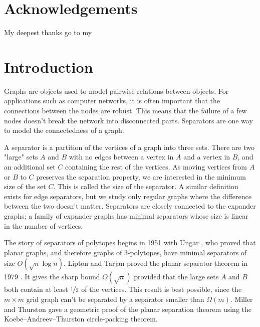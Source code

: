 \documentclass[a4paper,12pt]{book}
\theoremstyle{plain}
\theoremstyle{definition}
\begin{document}
\cleardoublepage




\pagestyle{scrheadings}

\newcommand{\header}[1]{\markboth{}{\MakeUppercase{ #1}}}


\chapter*{Acknowledgements}
\header{Acknowledgements}

My deepest thanks go to my 




\cleardoublepage

\tableofcontents

\cleardoublepage


\chapter{Introduction}
\label{intro}

Graphs are objects used to model pairwise relations between objects. For applications such as computer
networks, it is often important that the connections between the nodes are robust. This means that the failure of a few nodes doesn't 
break the network into disconnected parts. Separators are one way to model the connectedness of a graph. 

A separator is a partition of the vertices of a graph into three sets. There are two "large" sets $A$ and $B$ with no edges
between a vertex in $A$ and a vertex in $B$, and 
an additional set $C$ containing the rest of the vertices. As moving vertices from $A$ or $B$ to
$C$ preserves the separation property, we are interested in the minimum size of the set $C$. 
This is called the size of the separator. A similar definition exists for edge separators, but we study
only regular graphs where the difference between the two doesn't matter.
Separators are closely connected to the expander graphs; a family of expander graphs has minimal separators
whose size is linear in the number of vertices.

The story of separators of polytopes begins in 1951 with Ungar \cite{Ungar1951},
who proved that planar graphs, and therefore graphs of 3-polytopes, have minimal 
separators of size $O(\sqrt{n} \log n)$. Lipton and Tarjan proved the planar 
separator theorem in 1979 \cite{LiTa}. It gives the sharp bound
$O(\sqrt{n})$ provided that the large sets $A$ and $B$ both contain at least $\nicefrac{1}{3}$ of the vertices.
This result is best possible, since the $m\times m$ grid graph
can't be separated by a separator smaller than $\Omega(m)$. Miller and Thurston \cite{MillerThurston-separators} gave a 
geometric proof of the planar separation theorem using the  
Koebe–Andreev–Thurston circle-packing theorem.
\end{document}
